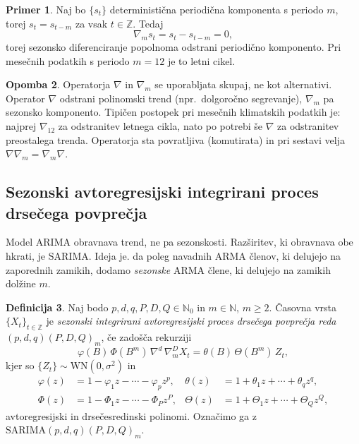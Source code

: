 \documentclass[11pt]{amsart}
\newcommand{\N}{\mathbb{N}}
\newcommand{\Z}{\mathbb{Z}}
\newcommand{\WN}{\mathrm{WN}}
\theoremstyle{definition}
\newtheorem{definicija}{Definicija}[section]
\newtheorem{primer}[definicija]{Primer}
\newtheorem{opomba}[definicija]{Opomba}
\theoremstyle{plain}
\begin{document}
\begin{primer}
    Naj bo $\{s_t\}$ deterministična periodična komponenta s periodo $m$, torej $s_t = s_{t-m}$ 
    za vsak $t \in \Z$. Tedaj
    \[
        \nabla_m s_t = s_t - s_{t-m} = 0,
    \]
    torej sezonsko diferenciranje popolnoma odstrani periodično komponento. Pri mesečnih 
    podatkih s periodo $m = 12$ je to letni cikel.
\end{primer}

\begin{opomba}
    Operatorja $\nabla$ in $\nabla_m$ se uporabljata skupaj, ne kot alternativi. Operator 
    $\nabla$ odstrani polinomski trend (npr.\ dolgoročno segrevanje), $\nabla_m$ pa sezonsko 
    komponento. Tipičen postopek pri mesečnih klimatskih podatkih je: najprej $\nabla_{12}$ za 
    odstranitev letnega cikla, nato po potrebi še $\nabla$ za odstranitev preostalega trenda.
    Operatorja sta povratljiva (komutirata) in pri sestavi velja $\nabla \nabla_m = \nabla_m \nabla$.
\end{opomba}

\subsection*{Sezonski avtoregresijski integrirani proces drsečega povprečja}

Model $\mathrm{ARIMA}$ obravnava trend, ne pa sezonskosti. Razširitev, ki obravnava obe 
hkrati, je $\mathrm{SARIMA}$. Ideja je. da poleg navadnih $\mathrm{ARMA}$ členov, 
ki delujejo na zaporednih zamikih, dodamo \emph{sezonske} $\mathrm{ARMA}$ člene, ki 
delujejo na zamikih dolžine $m$.

\begin{definicija}
    Naj bodo $p, d, q, P, D, Q \in \N_0$ in $m \in \N$, $m \geq 2$. Časovna vrsta 
    $\{X_t\}_{t \in \Z}$ je \emph{sezonski integrirani avtoregresijski proces drsečega 
    povprečja reda $(p,d,q)(P,D,Q)_m$}, če zadošča rekurziji
    \[
        \varphi(B)\,\Phi(B^m)\,\nabla^d\,\nabla_m^D X_t = \theta(B)\,\Theta(B^m)\,Z_t,
    \]
    kjer so $\{Z_t\} \sim \WN(0, \sigma^2)$ in
    \begin{align*}
        \varphi(z) &= 1 - \varphi_1 z - \cdots - \varphi_p z^p, 
        & \theta(z) &= 1 + \theta_1 z + \cdots + \theta_q z^q, \\
        \Phi(z)    &= 1 - \Phi_1 z - \cdots - \Phi_P z^P,
        & \Theta(z) &= 1 + \Theta_1 z + \cdots + \Theta_Q z^Q,
    \end{align*}
    avtoregresijski in drsečesredinski polinomi. Označimo ga z 
    $\mathrm{SARIMA}(p,d,q)(P,D,Q)_m$.
\end{definicija}
\end{document}
